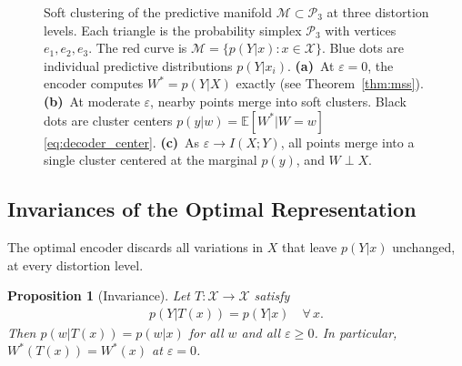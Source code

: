 \documentclass[11pt]{article}
\newtheorem{proposition}{Proposition}
\begin{document}
\begin{figure}[h]
\caption{Soft clustering of the predictive manifold
$\mathcal{M}\subset\mathcal{P}_3$ at three distortion levels.
Each triangle is the probability simplex $\mathcal{P}_3$ with
vertices $e_1,e_2,e_3$.
The red curve is $\mathcal{M}=\{p(Y|x):x\in\mathcal{X}\}$.
Blue dots are individual predictive distributions $p(Y|x_i)$.
\textbf{(a)}~At $\varepsilon=0$, the encoder computes $W^*=p(Y|X)$
exactly (see Theorem~\ref{thm:mss}).
\textbf{(b)}~At moderate $\varepsilon$, nearby points merge into
soft clusters. Black dots are cluster centers
$p(y|w)=\mathbb{E}[W^*|W{=}w]$ \eqref{eq:decoder_center}.
\textbf{(c)}~As $\varepsilon\to I(X;Y)$, all points merge into a
single cluster centered at the marginal $p(y)$, and $W\perp X$.}
\label{fig:soft_clustering}
\end{figure}

\subsection{Invariances of the Optimal Representation}

The optimal encoder discards all variations in $X$ that leave
$p(Y|x)$ unchanged, at every distortion level.

\begin{proposition}[Invariance]
\label{prop:invariance}
Let $T:\mathcal{X}\to\mathcal{X}$ satisfy
\begin{align}
    p(Y|T(x)) = p(Y|x) \quad \forall\, x.
    \label{eq:invariance_cond}
\end{align}
Then $p(w|T(x))=p(w|x)$ for all $w$ and all $\varepsilon\geq 0$.
In particular, $W^*(T(x))=W^*(x)$ at $\varepsilon=0$.
\end{proposition}
\end{document}
